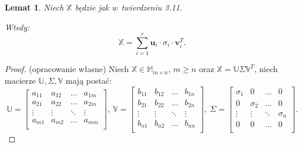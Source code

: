 \documentclass[12pt,a4paper]{report}
\newtheorem{lemat}[df]{Lemat}
\begin{document}
\begin{lemat}
Niech $\mathbb{X}$ będzie jak w~twierdzeniu 3.11.

Wtedy:
$$
\mathbb{X} = \sum_{i=1}^r \mathbf{u}_i \cdot\sigma_i \cdot \mathbf{v}_i^T.
$$
\end{lemat}
\begin{proof}(opracowanie własne)
Niech $\mathbb{X} \in \mathbb{M}_{m \times n}$, $m \geq n$ oraz $\mathbb{X}=\mathbb{U} \Sigma \mathbb{V}^T$, niech macierze $\mathbb{U}, \Sigma, \mathbb{V}$ mają postać:
$$
\mathbb{U} = \left[
        \begin{array}{cccc}
         a_{11} & a_{12} & \ldots & a_{1m} \\
         a_{21} & a_{22} & \ldots & a_{2m} \\
         \vdots & \vdots & \ddots & \vdots \\
         a_{m1} & a_{m2} & \ldots & a_{mm} \\
         \end{array}
      \right], \: \mathbb{V} = \left[
        \begin{array}{cccc}
         b_{11} & b_{12} & \ldots & b_{1n}  \\
         b_{21} & b_{22} & \ldots & b_{2n} \\
         \vdots & \vdots & \ddots & \vdots \\
         b_{n1} & b_{n2} & \ldots & b_{nn} \\
         \end{array}
      \right], \: \Sigma = \left[
        \begin{array}{cccc}
         \sigma_{1} & 0 & \ldots & 0 \\
         0 & \sigma_{2} & \ldots & 0 \\
         \vdots & \vdots & \ddots & \sigma_{n} \\
         0 & 0 & \ldots & 0 \\
         \end{array}
      \right].$$
      

\end{proof}
\end{document}
